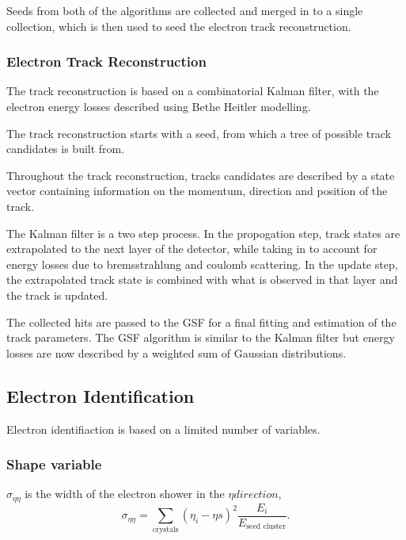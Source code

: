 Seeds from both of the algorithms are collected and merged in to a single
collection, which is then used to seed the electron track reconstruction.

\subsubsection{Electron Track Reconstruction}
The track reconstruction is based on a combinatorial Kalman filter, with the electron energy losses described using Bethe Heitler
modelling.

The track reconstruction starts with a seed, from which a tree of possible track
candidates is built from. 

Throughout the track reconstruction, tracks candidates are described by a state
vector containing information on the momentum, direction and position of the
track.

The Kalman filter is a
two step process. In the propogation step, track states are extrapolated to
the next layer of the detector, while taking in to account for energy losses due
to bremsstrahlung and coulomb scattering. 
In the update step, the extrapolated track state is 
combined with what is observed in that layer and the track is updated. 

The collected hits are passed to the GSF for a final fitting and estimation of
the track parameters. The GSF algorithm is similar to the Kalman filter but
energy losses are now described by a weighted sum of Gaussian distributions.

\subsection{Electron Identification}
Electron identifiaction is based on a limited number of variables.

\subsubsection{Shape variable }

$\sigma_{\eta\eta}$ is the width of the electron shower in the $\eta direction$,
\begin{equation}
\sigma_{\eta\eta} = 
\sum_{\text{crystals}} \left(\eta_{i} - \eta{s}\right)^{2}
\frac{E_{i}}{E_{\text{seed cluster}}}.
\end{equation}

